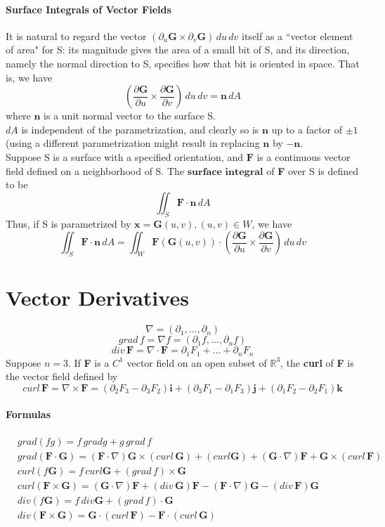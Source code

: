 \documentclass[11pt]{article}
\newcommand{\tb}[1]{\textbf{#1}}
\newcommand{\real}[0]{\mathbb{R}}
\newcommand{\vx}[0]{\tb{x}}
\newcommand{\vf}[0]{\tb{F}}
\newcommand{\vi}[0]{\tb{i}}
\newcommand{\vj}[0]{\tb{j}}
\newcommand{\vk}[0]{\tb{k}}
\newcommand{\vg}[0]{\tb{G}}
\begin{document}
\paragraph{Surface Integrals of Vector Fields} It is natural to regard the vector $(\partial_u \tb{G} \times \partial_v \tb{G}) \, du \, dv$ itself as a ``vector element of area" for S: its magnitude gives the area of a small bit of S, and its direction, namely the normal direction to S, specifies how that bit is oriented in space. That is, we have
$$(\frac{\partial \tb{G}}{\partial u} \times \frac{\partial \tb{G}}{\partial v}) \, du \, dv = \tb{n}\, dA$$ where $\tb{n}$ is a unit normal vector to the surface S. \\
$dA$ is independent of the parametrization, and clearly so is $\tb{n}$ up to a factor of $\pm 1$ (using a different parametrization might result in replacing $\tb{n}$ by $-\tb{n}$. \\
Suppose S is a surface with a specified orientation, and $\tb{F}$ is a continuous vector field defined on a neighborhood of S. The $\tb{surface integral}$ of \tb{F} over S is defined to be $$\iint_S \tb{F}\cdot \tb{n}\, dA$$
Thus, if S is parametrized by $\vx = \tb{G}(u,v), (u,v)\in W$, we have
$$\iint_S \tb{F}\cdot \tb{n}\, dA = \iint_W \tb{F}(\tb{G}(u,v))\cdot (\frac{\partial \tb{G}}{\partial u} \times \frac{\partial \tb{G}}{\partial v}) \, du \, dv$$
\section{Vector Derivatives}
$$\nabla = (\partial_1,\hdots,\partial_n)$$
$$grad\,f = \nabla f = (\partial_1 f, \hdots, \partial_n f)$$
$$div \, \tb{F} = \nabla \cdot \tb{F} = \partial_1 F_1 + \hdots+\partial_n F_n$$
Suppose $n = 3$. If \tb{F} is a $C^1$ vector field on an open subset of $\real^3$, the \tb{curl} of \tb{F} is the vector field defined by
$$curl\, \tb{F} = \nabla \times \vf = (\partial_2F_3 - \partial_3F_2)\vi +(\partial_3F_1 - \partial_1F_3)\vj + (\partial_1F_2 - \partial_2F_1)\vk$$
\paragraph{Formulas}
\begin{align}
	&grad(fg)=f\,grad g + g\,grad\,f\\
	&grad(\vf \cdot \tb{G}) = (\vf \cdot \nabla)\vg \times (curl \, \vg) + (curl \vg) + (\vg \cdot \nabla)\vf + \vg \times (curl\, \vf)\\
	&curl(f\vg)=f\,curl\vg+(grad\,f)\times \vg\\
	&curl(\vf \times \vg) = (\vg \cdot \nabla)\vf + (div \, \vg)\vf - (\vf \cdot \nabla)\vg - (div \,\vf)\vg\\
	&div(f\vg)=f\,div\vg+(grad\,f)\cdot\vg\\
	&div(\vf\times\vg)=\vg \cdot (curl\,\vf) - \vf\cdot(curl\,\vg)
\end{align}
\end{document}
